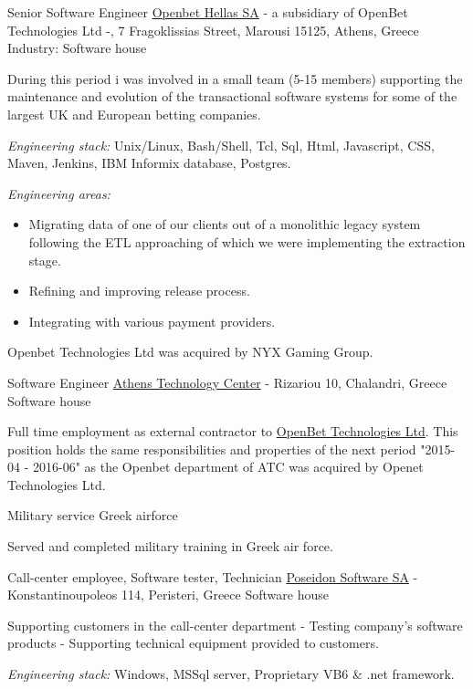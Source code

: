 \documentclass[arial, english, nologo, notitle, totpages]{europecv2013}
\begin{document}
\begin{europecv}
	{Senior Software Engineer}
    {\href{https://www.openbet.com}{Openbet Hellas SA} {\tiny- a subsidiary of OpenBet Technologies Ltd -, 7 Fragoklissias Street, Marousi 15125, Athens, Greece}}
    {Industry: Software house}
    {
	\begin{small}
    	During this period i was involved in a small team (5-15 members) supporting the maintenance and evolution of the transactional software systems for some of the largest UK and European betting companies.
        \begin{flushleft}
        	\textit{Engineering stack:} Unix/Linux, Bash/Shell, Tcl, Sql, Html, Javascript, CSS, Maven, Jenkins, IBM Informix database, Postgres.
        \end{flushleft}
		\textit{Engineering areas:}
		\begin{itemize}[label=\raisebox{0.25ex}{\tiny$\bullet$}, leftmargin=+1.0cm]
    		\item Migrating data of one of our clients out of a monolithic legacy system following the ETL approaching of which we were implementing the extraction stage.
			\item Refining and improving release process.
			\item Integrating with various payment providers.
		\end{itemize}
    \end{small}

    Openbet Technologies Ltd was acquired by NYX Gaming Group.
	}

	{Software Engineer}
    {\href{http://www.atc.gr}{Athens Technology Center} {\tiny - Rizariou 10, Chalandri, Greece}}
    {Software house}
    {
	\begin{small}
    	Full time employment as external contractor to \href{http://www.openbet.com}{OpenBet Technologies Ltd}. This position holds the same responsibilities and properties of the next period "2015-04 - 2016-06" as the Openbet department of ATC was acquired by Openet Technologies Ltd.
	\end{small}
    }

	{Military service}
    {Greek airforce}
    {}
    {
	\begin{small}
        Served and completed military training in Greek air force.
	\end{small}
	}

	{Call-center employee, Software tester, Technician}
    {\href{http://www.poseidon.gr}{Poseidon Software SA}  {\tiny - Konstantinoupoleos 114, Peristeri, Greece}}
    {Software house}
    {
    \begin{small}
    	Supporting customers in the call-center department - Testing company's software products - Supporting technical equipment provided to customers.
		\begin{flushleft}
			\textit{Engineering stack:} Windows, MSSql server, Proprietary VB6 \& .net framework.
        \end{flushleft}
    \end{small}
	}


\end{europecv}
\end{document}
